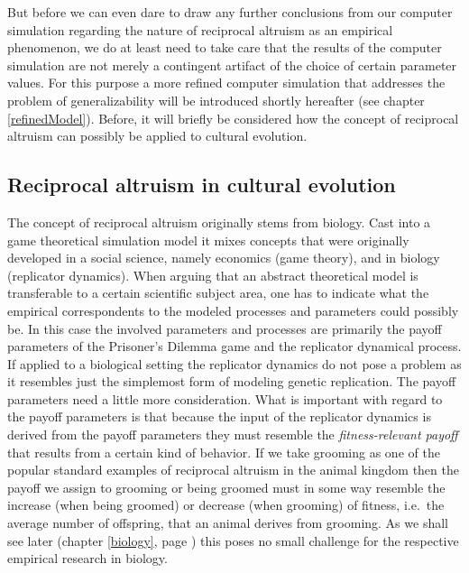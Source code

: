 But before we can even dare to draw any further conclusions from our computer
simulation regarding the nature of reciprocal altruism as an empirical
phenomenon, we do at least need to take care that the results of the computer
simulation are not merely a contingent artifact of the choice of certain
parameter values. For this purpose a more refined computer simulation that
addresses the problem of generalizability will be introduced shortly hereafter
(see chapter \ref{refinedModel}). Before, it will briefly be
considered how the concept of reciprocal
altruism can possibly be applied to cultural evolution.


\subsection{Reciprocal altruism in cultural evolution}

The concept of reciprocal altruism originally stems from biology. Cast into a
game theoretical simulation model it mixes concepts that were originally
developed in a social science, namely economics (game theory), and in biology
(replicator dynamics). When arguing that an abstract theoretical model is
transferable to a certain scientific subject area, one has to indicate what
the empirical correspondents to the modeled processes and parameters could
possibly be. In this case the involved parameters and processes are primarily
the payoff parameters of the Prisoner's Dilemma game and the replicator
dynamical process. If applied to a biological setting the replicator dynamics
do not pose a problem as it resembles just the simplemost form of modeling
genetic replication. The payoff parameters need a little more consideration.
What is important with regard to the payoff parameters is that because the
input of the replicator dynamics is derived from the payoff parameters they
must resemble the {\em fitness-relevant payoff} that results from a certain
kind of behavior. If we take grooming as one of the popular standard examples
of reciprocal altruism in the animal kingdom then the payoff we assign to
grooming or being groomed must in some way resemble the increase (when being
groomed) or decrease (when grooming) of fitness, i.e.\ the average number of
offspring, that an animal derives from grooming. As we shall see later
(chapter \ref{biology}, page \pageref{grooming}) this poses no small
challenge for the respective empirical research in biology.

